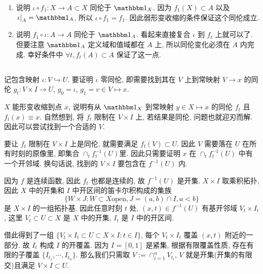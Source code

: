 \begin{enumerate}[label=(\alph*)]
    \item 说明 $\iota \circ f_1:X \rightarrow A \subset X$ 同伦于 $\id{X}$. 因为 $f_1(X) \subset A$ 以及 $\left.\iota\right|_{A} = \id{A}$, 所以 $\iota \circ f_1 = f_1$. 因此弱形变收缩的条件保证这个同伦成立.
    \item 说明 $f_1 \circ \iota:A \rightarrow A$ 同伦于 $\id{A}$. 看起来直接复合 $\iota$ 到 $f_t$ 上就可以了. 但要注意 $\id{A}$ 定义域和值域都在 $A$ 上, 所以同伦变化必须在 $A$ 内完成. 幸好条件中 $\forall t, f_t(A) \subset A$ 保证了这一点.
\end{enumerate}

\subsection{} %
记包含映射 $\iota: V \hookrightarrow U$. 要证明 $\iota$ 零同伦, 即需要找到其在 $V$ 上到常映射 $V \rightarrow x$ 的同伦 $g_t: V \times I \rightarrow U$, $g_0 = \iota$, $g_1 = v \in V \mapsto x$.

$X$ 能形变收缩到点 $x$, 说明有从 $\id{X}$ 到常映射 $y \in X \mapsto x$ 的同伦 $f_t$ 且 $f_t(x) \equiv x$. 自然想到, 将 $f_t$ 限制在 $V \times I$ 上, 若结果是同伦, 问题也就迎刃而解. 因此可以尝试找到一个合适的 $V$.

要让 $f_t$ 限制在 $V \times I$ 上是同伦, 就需要满足 $f_t(V) \subset U$. 因此 $V$ 需要落在 $U$ 在所有时刻的原像里, 即集合 $\cap_{t}f_t^{-1}(U)$里. 因此只需要证明 $x$ 在 $\cap_{t}f_t^{-1}(U)$ 中有一个开邻域. 换句话说, 找到的 $V \times I$ 要包含在 $f^{-1}(U)$ 内.

因为 $f$ 是连续函数, 因此 $f_t$ 也都是连续的, 故 $f^{-1}(U)$ 是开集. $X \times I$ 取乘积拓扑, 因此 $X$ 中的开集和 $I$ 中开区间的笛卡尔积构成的集族
$$
\{W \times J : W \subset X \text{open}, J = (a, b) \cap I, a < b\}
$$
是 $X \times I$ 的一组拓扑基. 因此任意时刻 $t$ 处, $(x, t) \in f^{-1}(U)$ 有基开邻域 $V_t \times I_t$, 这里 $V_t \subset U \subset X$ 是 $X$ 中的开集, $I_t$ 是 $I$ 中的开区间.

借此得到了一组 $\{V_t \times I_t \subset U \subset X \times I: t \in I\}$, 每个 $V_t \times I_t$ 覆盖 $(x, t)$ 附近的一部分. 故 $I_t$ 构成 $I$ 的开覆盖. 因为 $I = [0, 1]$ 是紧集, 根据有限覆盖性质, 存在有限的子覆盖 $\{I_{t_1}, \cdots, I_{t_n}\}$. 那么我们只需取 $V := \cap_{i = 1}^{n}V_{t_i}$, $V$ 就是开集(开集的有限交)且满足 $V \times I \subset U$. 

